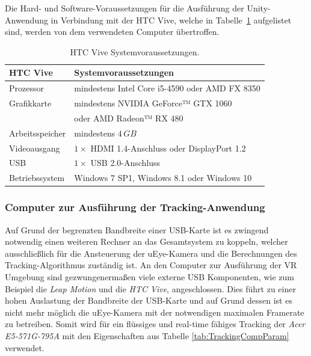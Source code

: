 Die Hard- und Software-Voraussetzungen für die Ausführung der Unity-Anwendung in Verbindung mit der HTC Vive, welche in Tabelle~\ref{tab:viveReq} aufgelistet sind, werden von dem verwendeten Computer übertroffen.

\begin{table}
	\centering
	\begin{tabular}{|l|l|}
		\hline
		\Absatzbox{}
		\textbf{HTC Vive}& \textbf{Systemvoraussetzungen} \\
		\hline
		Prozessor & mindestens Intel Core i5-4590 oder AMD FX 8350\\
		\hline
		Grafikkarte & mindestens NVIDIA GeForce™ GTX 1060\\
		&oder AMD Radeon™ RX 480\\
		\hline
		Arbeitsspeicher & mindestens $4\,GB$\\		
		\hline
		Videoausgang & $1\times$ HDMI 1.4-Anschluss oder DisplayPort 1.2\\
		\hline
		USB & $1\times$ USB 2.0-Anschluss\\
		\hline
		Betriebssystem & Windows 7 SP1, Windows 8.1 oder Windows 10\\
		\hline
	\end{tabular}
	\caption{HTC Vive Systemvoraussetzungen. \cite{website:HTC_Vive_Ready}}
	\label{tab:viveReq}
\end{table}

\subsubsection{Computer zur Ausführung der Tracking-Anwendung}\label{sec:TrackingComp}

Auf Grund der begrenzten Bandbreite einer USB-Karte ist es zwingend notwendig einen weiteren Rechner an das Gesamtsystem zu koppeln, welcher ausschließlich für die Ansteuerung der uEye-Kamera und die Berechnungen des Tracking-Algorithmus zuständig ist. 
An den Computer zur Ausführung der VR Umgebung sind gezwungenermaßen viele externe USB Komponenten, wie zum Beispiel die \textit{Leap Motion} und die \textit{HTC Vive}, angeschlossen. Dies führt zu einer hohen Auslastung der Bandbreite der USB-Karte und auf Grund dessen ist es nicht mehr möglich die uEye-Kamera mit der notwendigen maximalen Framerate zu betreiben. Somit wird für ein flüssiges und real-time fähiges Tracking der \textit{Acer E5-571G-795A} mit den Eigenschaften aus Tabelle \ref{tab:TrackingCompParam} verwendet.

